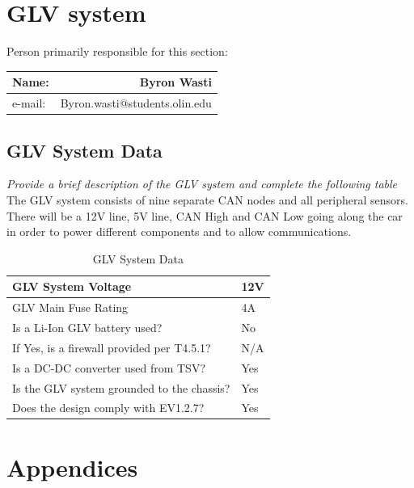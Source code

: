 \documentclass{article}
\begin{document}
\section{GLV system}
Person primarily responsible for this section:

    \begin{table}[H]
        \centering
        \label{responsible7}
        \begin{tabular}{lr}
        Name: & Byron Wasti \\ \hline
        e-mail: & Byron.wasti@students.olin.edu \\ \hline
        \end{tabular}
    \end{table}

\subsection{GLV System Data}

\textit{Provide a brief description of the GLV system and complete the following table}\\

\textnormal{The GLV system consists of nine separate CAN nodes and all peripheral sensors. There will be a 12V line, 5V line, CAN High and CAN Low going along the car in order to power different components and to allow communications.}

\begin{table}[H]
\centering
\begin{tabular}{|l|l|}
\hline
GLV System Voltage & 12V \\ \hline
GLV Main Fuse Rating & 4A \\ \hline
Is a Li-Ion GLV battery used? & No \\ \hline
If Yes, is a firewall provided per T4.5.1? & N/A \\ \hline
Is a DC-DC converter used from TSV? & Yes \\ \hline
Is the GLV system grounded to the chassis? & Yes \\ \hline
Does the design comply with EV1.2.7? & Yes \\ \hline
\end{tabular}
\caption{GLV System Data}
\label{glvtable}
\end{table}

\section{Appendices}
\end{document}
